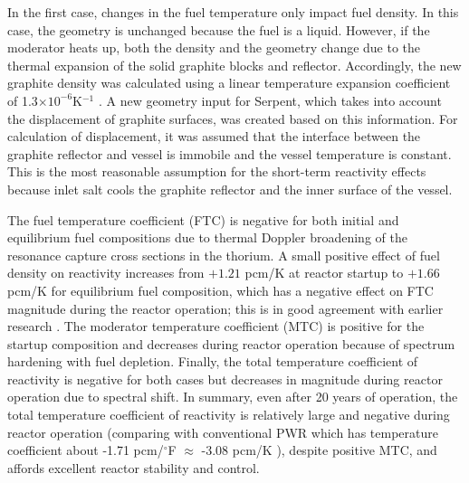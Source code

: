 In the first case, changes in the fuel temperature only impact fuel density. 
In this case, the geometry is unchanged because the fuel is a liquid. However, 
if the moderator heats up, both the density and the geometry change due to 
the thermal expansion of the solid graphite blocks and reflector. Accordingly, 
the new graphite density was calculated using a linear temperature expansion 
coefficient of 1.3$\times10^{-6}$K$^{-1}$ \cite{robertson_conceptual_1971}. A 
new geometry input for Serpent, which takes into account the displacement of 
graphite surfaces, was created based on this information. For calculation of 
displacement, it was assumed that the interface between the graphite reflector 
and vessel is immobile and the vessel temperature is constant. This 
is the most reasonable assumption for the short-term reactivity effects 
because inlet salt cools the graphite reflector and the inner surface of the 
vessel.

The fuel temperature coefficient (FTC) is negative for both initial and 
equilibrium fuel compositions due to thermal Doppler broadening of the 
resonance capture cross sections in the thorium. A small positive effect of 
fuel density on reactivity increases from $+1.21$ pcm/K at reactor startup to 
$+1.66$ pcm/K for equilibrium fuel composition, which has a negative effect on 
FTC magnitude during the reactor operation; this is in good agreement with 
earlier research \cite{robertson_conceptual_1971,park_whole_2015}. The 
moderator temperature coefficient (MTC) is positive for the startup 
composition and decreases during reactor operation because of spectrum 
hardening with fuel depletion. Finally, the total temperature coefficient of 
reactivity is negative for both cases but decreases in magnitude during 
reactor operation due to spectral shift. In summary, even after 20 years of 
operation, the total temperature coefficient of reactivity is relatively large 
and negative during reactor operation (comparing with conventional PWR which 
has temperature coefficient about -1.71 pcm/$^\circ$F $\approx$ -3.08 pcm/K 
\cite{forget_integral_2018}), despite positive MTC, and affords excellent 
reactor stability and control.

